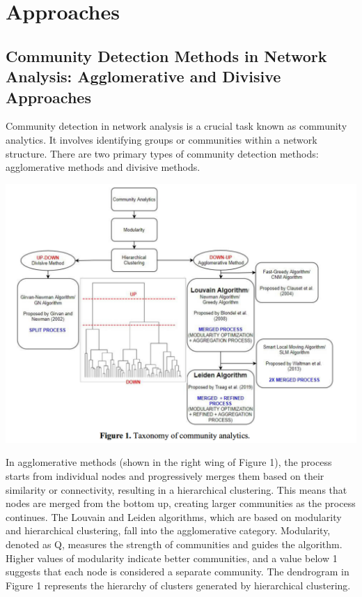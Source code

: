 \section{Approaches}

\subsection{Community Detection Methods in Network Analysis: Agglomerative and Divisive Approaches}
Community detection in network analysis is a crucial task known as community analytics. It involves identifying groups or communities within a network structure. There are two primary types of community detection methods: agglomerative methods and divisive methods.
\begin{center}
    \includegraphics[scale=0.45]{image/jpcsj.png}
\end{center}
In agglomerative methods (shown in the right wing of Figure 1), the process starts from individual nodes and progressively merges them based on their similarity or connectivity, resulting in a hierarchical clustering. This means that nodes are merged from the bottom up, creating larger communities as the process continues. The Louvain and Leiden algorithms, which are based on modularity and hierarchical clustering, fall into the agglomerative category. Modularity, denoted as Q, measures the strength of communities and guides the algorithm. Higher values of modularity indicate better communities, and a value below 1 suggests that each node is considered a separate community. The dendrogram in Figure 1 represents the hierarchy of clusters generated by hierarchical clustering.

